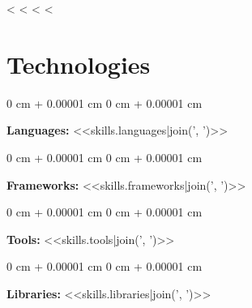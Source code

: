 \documentclass[10pt, letterpaper]{article}
\newenvironment{onecolentry}{
    \begin{adjustwidth}{
        0 cm + 0.00001 cm
    }{
        0 cm + 0.00001 cm
    }
}{
    \end{adjustwidth}
} %
\begin{document}
        <%
        \vspace{0.2cm}
        <%
    <%
    <%

    \section{Technologies}
    \begin{onecolentry}
        \textbf{Languages:} <<skills.languages|join(', ')>>
    \end{onecolentry}
    \vspace{0.2cm}
    \begin{onecolentry}
        \textbf{Frameworks:} <<skills.frameworks|join(', ')>>
    \end{onecolentry}
    \vspace{0.2cm}
    \begin{onecolentry}
        \textbf{Tools:} <<skills.tools|join(', ')>>
    \end{onecolentry}
    \vspace{0.2cm}
    \begin{onecolentry}
        \textbf{Libraries:} <<skills.libraries|join(', ')>>
    \end{onecolentry}
\end{document}
